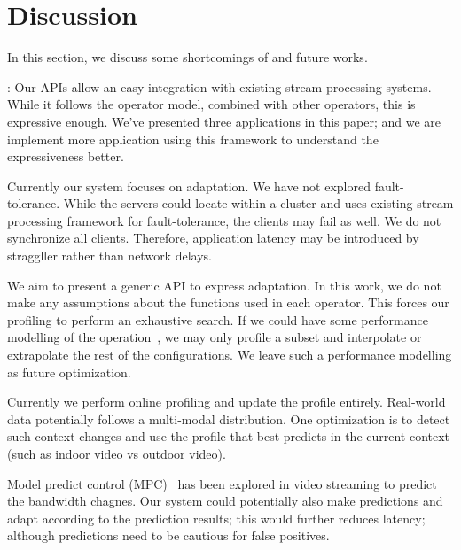 \section{Discussion}
\label{sec:discussion}

In this section, we discuss some shortcomings of \sysname{} and future works.

: Our \maybe{} APIs allow an easy integration with existing
stream processing systems. While it follows the operator model, combined with
other operators, this is expressive enough. We've presented three applications
in this paper; and we are implement more application using this framework to
understand the expressiveness better.

 Currently our system focuses on
adaptation. We have not explored fault-tolerance. While the servers could locate
within a cluster and uses existing stream processing framework for
fault-tolerance, the clients may fail as well. We do not synchronize all
clients. Therefore, application latency may be introduced by straggller rather
than network delays.

 We aim to present a generic API to express
adaptation. In this work, we do not make any assumptions about the functions
used in each operator. This forces our profiling to perform an exhaustive
search. If we could have some performance modelling of the
operation~\cite{venkataraman2016ernest}, we may only profile a subset and
interpolate or extrapolate the rest of the configurations. We leave such a
performance modelling as future optimization.

 Currently we perform online profiling and update the
profile entirely. Real-world data potentially follows a multi-modal
distribution. One optimization is to detect such context changes and use the
profile that best predicts in the current context (such as indoor video vs
outdoor video).

 Model predict control
(MPC)~\cite{yin2015control} has been explored in video streaming to predict the
bandwidth chagnes. Our system could potentially also make predictions and adapt
according to the prediction results; this would further reduces latency;
although predictions need to be cautious for false positives.

